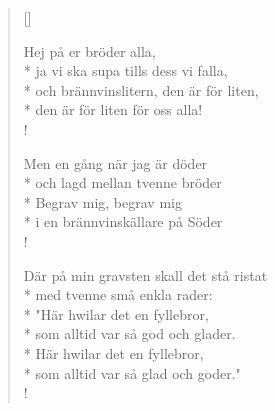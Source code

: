 
\settowidth{\versewidth}{ja vi ska supa tills dess vi falla,}



\begin{verse}[\versewidth]

Hej på er bröder alla,\\*
ja vi ska supa tills dess vi falla,\\*
och brännvinslitern, den är för liten,\\*
den är för liten för oss alla!\\!


Men en gång när jag är döder\\*
och lagd mellan tvenne bröder\\*
Begrav mig, begrav mig\\*
i en brännvinskällare på Söder\\!


Där på min gravsten skall det stå ristat\\*
med tvenne små enkla rader:\\*
"Här hwilar det en fyllebror,\\*
som alltid var så god och glader.\\*
Här hwilar det en fyllebror,\\*
som alltid var så glad och goder."\\!


\end{verse}

